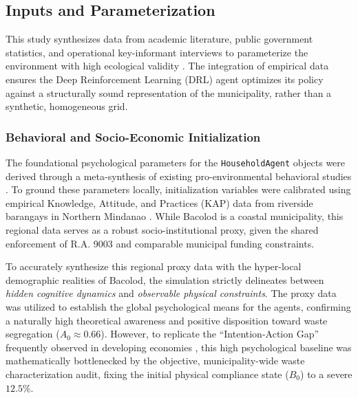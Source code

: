 \subsection{Inputs and Parameterization}

This study synthesizes data from academic literature, public government statistics, and operational key-informant interviews to parameterize the environment with high ecological validity \citep{McCulloch2022}. The integration of empirical data ensures the Deep Reinforcement Learning (DRL) agent optimizes its policy against a structurally sound representation of the municipality, rather than a synthetic, homogeneous grid.

\subsubsection{Behavioral and Socio-Economic Initialization}
The foundational psychological parameters for the \texttt{HouseholdAgent} objects were derived through a meta-synthesis of existing pro-environmental behavioral studies \citep{Taraghi2025, Moeini2023}. To ground these parameters locally, initialization variables were calibrated using empirical Knowledge, Attitude, and Practices (KAP) data from riverside barangays in Northern Mindanao \citep{Paigalan2025}. While Bacolod is a coastal municipality, this regional data serves as a robust socio-institutional proxy, given the shared enforcement of R.A. 9003 and comparable municipal funding constraints. 

To accurately synthesize this regional proxy data with the hyper-local demographic realities of Bacolod, the simulation strictly delineates between \textit{hidden cognitive dynamics} and \textit{observable physical constraints}. The proxy data was utilized to establish the global psychological means for the agents, confirming a naturally high theoretical awareness and positive disposition toward waste segregation ($A_0 \approx 0.66$). However, to replicate the ``Intention-Action Gap'' frequently observed in developing economies \citep{Yazawa2025, Geiger2021}, this high psychological baseline was mathematically bottlenecked by the objective, municipality-wide waste characterization audit, fixing the initial physical compliance state ($B_0$) to a severe $12.5\%$. 

